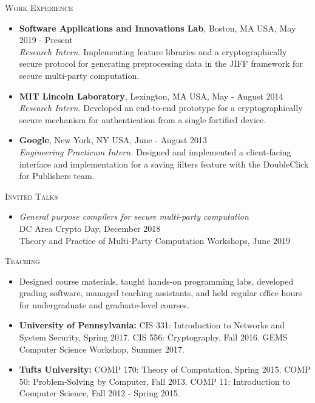 \documentclass{article}
\begin{document}
\textsc{Work Experience}
\begin{itemize}[label={}]
  \item \textbf{Software Applications and Innovations Lab}, Boston, MA USA, May 2019 - Present\\
  \textit{Research Intern.} Implementing feature libraries and a cryptographically secure protocol for generating preprocessing data in the JIFF framework for secure multi-party computation.
  \item \textbf{MIT Lincoln Laboratory}, Lexington, MA USA, May - August 2014 \\
  \textit{Research Intern.} Developed an end-to-end prototype for a cryptographically secure mechanism for authentication from a single fortified device.
  \item \textbf{Google}, New York, NY USA, June - August 2013\\
  \textit{Engineering Practicum Intern.} Designed and implemented a client-facing interface and implementation for a saving filters feature with the DoubleClick for Publishers team.
\end{itemize}

\textsc{Invited Talks}
\begin{itemize}[label={}]
\item \emph{General purpose compilers for secure multi-party computation}\\
  DC Area Crypto Day, December 2018 \\
  Theory and Practice of Multi-Party Computation Workshops, June 2019
\end{itemize}

\textsc{Teaching}
\begin{itemize}[label={}]
\item Designed course materials, taught hands-on programming labs, developed grading software, managed teaching assistants, and held regular office hours for undergraduate and graduate-level courses.

\item \textbf{University of Pennsylvania:}
CIS 331: Introduction to Networks and System Security, Spring 2017.
CIS 556: Cryptography, Fall 2016.
GEMS Computer Science Workshop, Summer 2017.
\item \textbf{Tufts University:} 
COMP 170: Theory of Computation, Spring 2015.
COMP 50: Problem-Solving by Computer, Fall 2013.
COMP 11: Introduction to Computer Science, Fall 2012 - Spring 2015.
\end{itemize}
\end{document}
